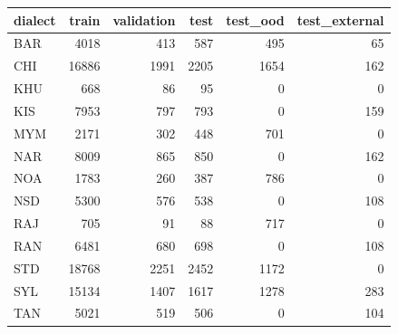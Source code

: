 \begin{tabular}{lrrrrr}
\toprule
dialect & train & validation & test & test\_ood & test\_external \\
\midrule
BAR & 4018 & 413 & 587 & 495 & 65 \\
CHI & 16886 & 1991 & 2205 & 1654 & 162 \\
KHU & 668 & 86 & 95 & 0 & 0 \\
KIS & 7953 & 797 & 793 & 0 & 159 \\
MYM & 2171 & 302 & 448 & 701 & 0 \\
NAR & 8009 & 865 & 850 & 0 & 162 \\
NOA & 1783 & 260 & 387 & 786 & 0 \\
NSD & 5300 & 576 & 538 & 0 & 108 \\
RAJ & 705 & 91 & 88 & 717 & 0 \\
RAN & 6481 & 680 & 698 & 0 & 108 \\
STD & 18768 & 2251 & 2452 & 1172 & 0 \\
SYL & 15134 & 1407 & 1617 & 1278 & 283 \\
TAN & 5021 & 519 & 506 & 0 & 104 \\
\bottomrule
\end{tabular}
